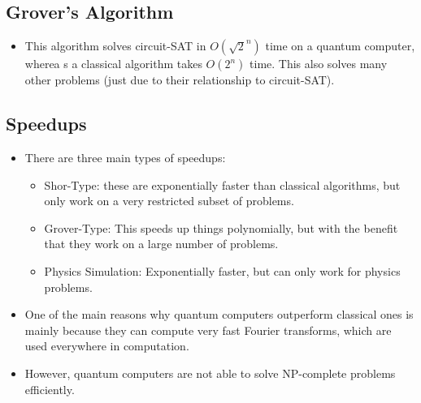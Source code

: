 \subsection{Grover's Algorithm}
\begin{itemize}
	\item This algorithm solves circuit-SAT in \( O(\sqrt{2} ^{n}) \) time on a quantum computer, wherea s
		a classical algorithm takes \( O(2^{n}) \) time. This also solves many other problems (just due to their 
		relationship to circuit-SAT).
\end{itemize}
\subsection{Speedups}
\begin{itemize}
	\item There are three main types of speedups:
		\begin{itemize}
			\item Shor-Type: these are exponentially faster than classical algorithms, but only work on 
				a very restricted subset of problems.
			\item Grover-Type: This speeds up things polynomially, but with the benefit that they work on a large
				number of problems. 
			\item Physics Simulation: Exponentially faster, but can only work for physics problems. 
		\end{itemize}
	\item One of the main reasons why quantum computers outperform classical ones is mainly because they can 
		compute very fast Fourier transforms, which are used everywhere in computation.  
	\item However, quantum computers are not able to solve NP-complete problems efficiently. 
\end{itemize}
